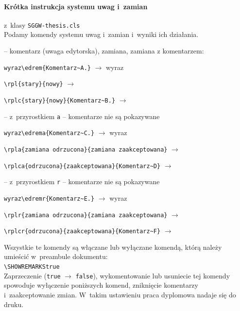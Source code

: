 \paragraph{Krótka instrukcja systemu uwag i~zamian} z~klasy {\tt SGGW-thesis.cls}\\
Podamy komendy systemu uwag i~zamian i~wyniki ich działania.
\begin{description}\small
\item[Komendy proste] -- komentarz (uwaga edytorska), zamiana, zamiana z komentarzem:
\item{\verb+wyraz\edrem{Komentarz~A.}+} $\rightarrow$ wyraz 
\item{\verb+\rpl{stary}{nowy}+} $\rightarrow$ 
\item{\verb+\rplc{stary}{nowy}{Komentarz~B.}+} $\rightarrow$  
\item[Komendy zaakceptowane] -- z~przyrostkiem {\tt a} -- komentarze nie są pokazywane
\item{\verb+wyraz\edrema{Komentarz~C.}+} $\rightarrow$ wyraz 
\item{\verb+\rpla{zamiana odrzucona}{zamiana zaakceptowana}+} $\rightarrow$ 
\item{\verb+\rplca{odrzucona}{zaakceptowana}{Komentarz~D}+} $\rightarrow$ 
\item[Komendy odrzucone] -- z~przyrostkiem {\tt r} -- komentarze nie są pokazywane
\item{\verb+wyraz\edremr{Komentarz~E.}+} $\rightarrow$ wyraz 
\item{\verb+\rplr{zamiana odrzucona}{zamiana zaakceptowana}+} $\rightarrow$ 
\item{\verb+\rplcr{odrzucona}{zaakceptowana}{Komentarz~F}+} $\rightarrow$ 
\end{description}\mbox{}\vspace{\parskip}

\noindent Wszystkie te komendy są włączane lub wyłączane komendą, którą należy umieścić w~preambule dokumentu:\\[2pt]
\verb+\SHOWREMARKStrue+\\[2pt]
Zaprzeczenie ({\tt true} $\rightarrow$ {\tt false}), wykomentowanie lub usuniecie tej komendy spowoduje wyłączenie poniższych komend, zniknięcie komentarzy i~zaakceptowanie zmian. W~takim ustawieniu praca dyplomowa nadaje się do druku.\mbox{}\\[\parskip]

